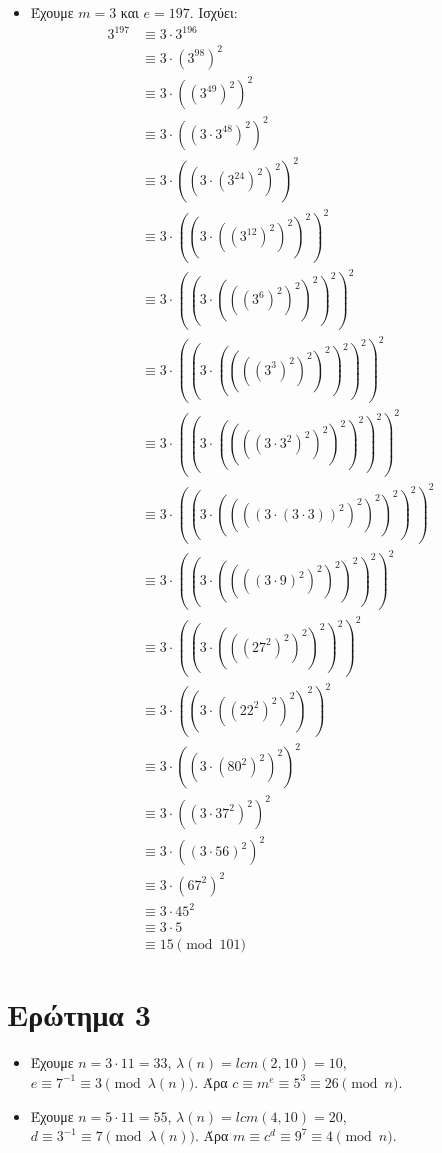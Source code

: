 \documentclass{article}
\begin{document}
\begin{itemize}
    \item {Έχουμε $m = 3$ και $e = 197$. Ισχύει:
        \begin{align*}
        3^{197}
        & \equiv 3 \cdot 3^{196} \\
        & \equiv 3 \cdot (3^{98})^2 \\
        & \equiv 3 \cdot ((3^{49})^2)^2 \\
        & \equiv 3 \cdot ((3 \cdot 3^{48})^2)^2 \\
        & \equiv 3 \cdot ((3 \cdot (3^{24})^2)^2)^2 \\
        & \equiv 3 \cdot ((3 \cdot ((3^{12})^2)^2)^2)^2 \\
        & \equiv 3 \cdot ((3 \cdot (((3^6)^2)^2)^2)^2)^2 \\
        & \equiv 3 \cdot ((3 \cdot ((((3^3)^2)^2)^2)^2)^2)^2 \\
        & \equiv 3 \cdot ((3 \cdot ((((3 \cdot 3^2)^2)^2)^2)^2)^2)^2 \\
        & \equiv 3 \cdot ((3 \cdot ((((3 \cdot (3 \cdot 3))^2)^2)^2)^2)^2)^2 \\
        & \equiv 3 \cdot ((3 \cdot ((((3 \cdot 9)^2)^2)^2)^2)^2)^2 \\
        & \equiv 3 \cdot ((3 \cdot (((27^2)^2)^2)^2)^2)^2 \\
        & \equiv 3 \cdot ((3 \cdot ((22^2)^2)^2)^2)^2 \\
        & \equiv 3 \cdot ((3 \cdot (80^2)^2)^2)^2 \\
        & \equiv 3 \cdot ((3 \cdot 37^2)^2)^2 \\
        & \equiv 3 \cdot ((3 \cdot 56)^2)^2 \\
        & \equiv 3 \cdot (67^2)^2 \\
        & \equiv 3 \cdot 45^2 \\
        & \equiv 3 \cdot 5 \\
        & \equiv 15 \pmod{101}
        \end{align*}}
\end{itemize}

\section*{Ερώτημα 3}

\begin{itemize}
    \item Έχουμε $n = 3 \cdot 11 = 33$, $\lambda(n) = lcm(2, 10) = 10$, $e \equiv 7^{-1} \equiv 3 \pmod {\lambda(n)}$. Άρα $c \equiv m^e \equiv 5^3 \equiv 26 \pmod n$.

    \item Έχουμε $n = 5 \cdot 11 = 55$, $\lambda(n) = lcm(4, 10) = 20$, $d \equiv 3^{-1} \equiv 7 \pmod {\lambda(n)}$. Άρα $m \equiv c^d \equiv 9^7 \equiv 4 \pmod n$.
\end{itemize}
\end{document}
